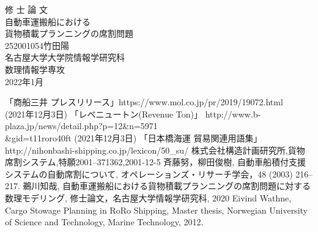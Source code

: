 \documentclass[uplatex]{ujreport}
\begin{document}
\begin{table}[b]
\begin{center}
{\huge 修\hspace{0.1cm} 士\hspace{0.1cm} 論\hspace{0.1cm} 文}\\[2.5cm]
{\huge 自動車運搬船における \\ 貨物積載プランニングの席割問題}\\[6cm]
{\huge 252001054\qquad 竹田陽}\\[1cm]
{\huge 名古屋大学大学院情報学研究科}\\[0.5cm]
{\huge 数理情報学専攻}\\[0.5cm]
{\huge 2022年1月}\\
\end{center}
\end{table}


\thispagestyle{empty}
\clearpage
\newpage
{}
\setcounter{page}{1}







\thispagestyle{empty}
\tableofcontents
\newpage
\setcounter{page}{1}
\pagestyle{plain}















\begin{thebibliography}{99}
 「商船三井 プレスリリース」https://www.mol.co.jp/pr/2019/19072.html \\ (2021年12月3日)
 「レベニュートン(Revenue Ton)」 http://www.b-plaza.jp/news/detail.php?p=12\&n=5971 \\
\&gid=t11roro40ft (2021年12月3日)
 「日本橋海運 貿易関連用語集」http://nihonbashi-shipping.co.jp/lexicon/50\_su/
  株式会社構造計画研究所,貨物席割システム,特願2001--371362,2001-12-5
 斉藤努，柳田俊樹, 自動車船積付支援システムの自動席割について, オペレーションズ・リサーチ学会，48 (2003) 216--217.
 鵜川知哉, 自動車運搬船における貨物積載プランニングの席割問題に対する数理モデリング, 修士論文，名古屋大学情報学研究科, 2020
Eivind Wathne, Cargo Stowage Planning in RoRo Shipping, Master thesis, Norwegian University of Science and Technology, Marine Technology, 2012.
\end{thebibliography}
\end{document}
